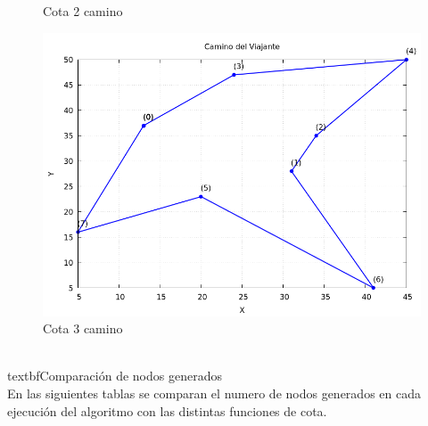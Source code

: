 \documentclass[11pt,openany]{book}
\begin{document}
\begin{figure}[H]
\begin{minipage}{.48\textwidth}
          \caption{Cota 2 camino}
          \label{fig:Cota 2 camino}
    \end{minipage}
\begin{minipage}{.48\textwidth}
      \centering
      \includegraphics[width=1\linewidth]{assets/Img/cota3camino.png}
      \caption{Cota 3 camino}
      \label{fig:Cota 3 camino}
\end{minipage}
\end{figure}
\\textbf{Comparación de nodos generados}
\\En las siguientes tablas se comparan el numero de nodos generados en cada ejecución del algoritmo con las distintas funciones de cota.
\end{document}
